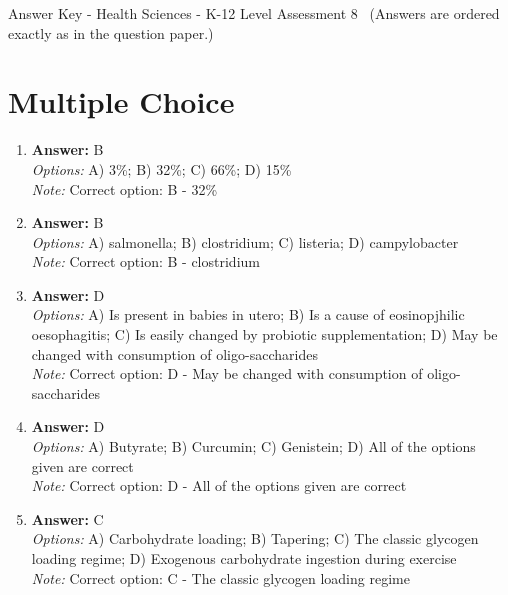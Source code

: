 \documentclass[12pt]{article}
\begin{document}
\begin{center}
Answer Key - Health Sciences - K-12 Level Assessment 8 \
\small (Answers are ordered exactly as in the question paper.)
\end{center}

\section*{Multiple Choice}
\begin{enumerate}[label=\arabic*.]
\item \textbf{Answer:} B
\\ \textit{Options:} A) 3\%; B) 32\%; C) 66\%; D) 15\%
\\ \textit{Note:} Correct option: B - 32\%
\item \textbf{Answer:} B
\\ \textit{Options:} A) salmonella; B) clostridium; C) listeria; D) campylobacter
\\ \textit{Note:} Correct option: B - clostridium
\item \textbf{Answer:} D
\\ \textit{Options:} A) Is present in babies in utero; B) Is a cause of eosinopjhilic oesophagitis; C) Is easily changed by probiotic supplementation; D) May be changed with consumption of oligo-saccharides
\\ \textit{Note:} Correct option: D - May be changed with consumption of oligo-saccharides
\item \textbf{Answer:} D
\\ \textit{Options:} A) Butyrate; B) Curcumin; C) Genistein; D) All of the options given are correct
\\ \textit{Note:} Correct option: D - All of the options given are correct
\item \textbf{Answer:} C
\\ \textit{Options:} A) Carbohydrate loading; B) Tapering; C) The classic glycogen loading regime; D) Exogenous carbohydrate ingestion during exercise
\\ \textit{Note:} Correct option: C - The classic glycogen loading regime
\end{enumerate}
\end{document}
